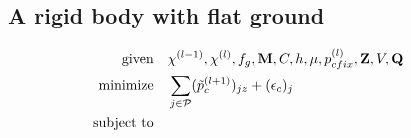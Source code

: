 \documentclass[a4paper,10pt]{article}
\begin{document}
\pagebreak

\subsection{A rigid body with flat ground}
\begin{align}
\text{given}      & \quad \chi^{(l-1)}, \chi^{(l)}, f_g, \mathbf{M}, C, h, \mu, p_{cfix}^{(l)}, \mathbf{Z}, V, \mathbf{Q}\notag\\
\text{minimize}   & \quad \sum_{j\in\mathcal{P}} (\tilde{p}_{c}^{(l+1)})_{jz} + (\epsilon_{c})_j \notag\\
\text{subject to} & \quad\quad\quad\quad\quad\quad\quad\quad\quad\quad\quad\quad\quad\quad\quad
\quad\quad\quad\quad\quad\quad\quad\quad\quad\quad\quad\quad\quad\quad\quad
\quad\quad\quad\quad\quad\quad\quad\quad\quad\quad\quad\quad\quad\quad\quad \notag
\end{align}
\end{document}
